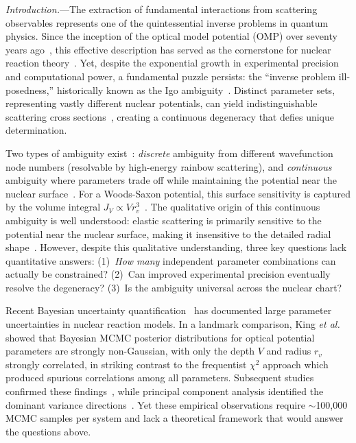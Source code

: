 \documentclass[aps,prl,reprint,superscriptaddress,showpacs]{revtex4-2}
\begin{document}
\textit{Introduction.}---The extraction of fundamental interactions from scattering observables represents one of the quintessential inverse problems in quantum physics. Since the inception of the optical model potential (OMP) over seventy years ago~\cite{Feshbach1954,Feshbach1958,Feshbach1962}, this effective description has served as the cornerstone for nuclear reaction theory~\cite{Hodgson1971,Satchler1983,Mahaux1991,Dickhoff2019}. Yet, despite the exponential growth in experimental precision and computational power, a fundamental puzzle persists: the ``inverse problem ill-posedness,'' historically known as the Igo ambiguity~\cite{Igo1958}. Distinct parameter sets, representing vastly different nuclear potentials, can yield indistinguishable scattering cross sections~\cite{Perey1976,Greenlees1968}, creating a continuous degeneracy that defies unique determination.

Two types of ambiguity exist~\cite{Satchler1983}: \emph{discrete} ambiguity from different wavefunction node numbers (resolvable by high-energy rainbow scattering), and \emph{continuous} ambiguity where parameters trade off while maintaining the potential near the nuclear surface~\cite{Greenlees1968}. For a Woods-Saxon potential, this surface sensitivity is captured by the volume integral $J_V \propto V r_v^3$~\cite{Satchler1983}. The qualitative origin of this continuous ambiguity is well understood: elastic scattering is primarily sensitive to the potential near the nuclear surface, making it insensitive to the detailed radial shape~\cite{Satchler1983}. However, despite this qualitative understanding, three key questions lack quantitative answers: (1)~\emph{How many} independent parameter combinations can actually be constrained? (2)~Can improved experimental precision eventually resolve the degeneracy? (3)~Is the ambiguity universal across the nuclear chart?

Recent Bayesian uncertainty quantification~\cite{Furnstahl2015,Phillips2021} has documented large parameter uncertainties in nuclear reaction models. In a landmark comparison, King \textit{et al.}~\cite{King2019PRL} showed that Bayesian MCMC posterior distributions for optical potential parameters are strongly non-Gaussian, with only the depth $V$ and radius $r_v$ strongly correlated, in striking contrast to the frequentist $\chi^2$ approach which produced spurious correlations among all parameters. Subsequent studies confirmed these findings~\cite{King2018,Lovell2021,Catacora2019}, while principal component analysis identified the dominant variance directions~\cite{Catacora2021}. Yet these empirical observations require $\sim$100,000 MCMC samples per system and lack a theoretical framework that would answer the questions above.
\end{document}
